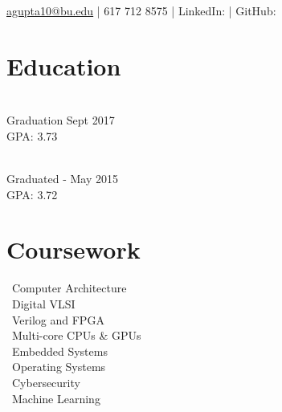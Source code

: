 \documentclass[]{deedy_format_Anmol}
\begin{document}
%
%
\lastupdated

%
%


{\href{mailto:agupta10@bu.edu}{agupta10@bu.edu} | 617 712 8575 | 
LinkedIn:  \href{https://www.linkedin.com/in/anmol-gupta-90b67a108}{} |
GitHub:   \href{https://github.com/anmolgupta1005/}{}
}

%
%

\begin{minipage}[t]{0.325\textwidth} 


\section{Education} 
\vspace{0.5mm} %
\\
Graduation Sept 2017 \\ GPA: 3.73
\sectionsep

\\		
Graduated - May 2015 \\ GPA: 3.72
\sectionsep

\sectionsep

\section{Coursework}
\vspace{0.5mm} %
\flushleft
\textbullet \, Computer Architecture\\
\textbullet \, Digital VLSI \\
\textbullet \, Verilog and FPGA\\
\textbullet \, Multi-core CPUs \& GPUs\\
\textbullet \, Embedded Systems\\
\textbullet \, Operating Systems\\
\textbullet \, Cybersecurity\\
\textbullet \, Machine Learning
\sectionsep



\end{minipage}
\end{document}
